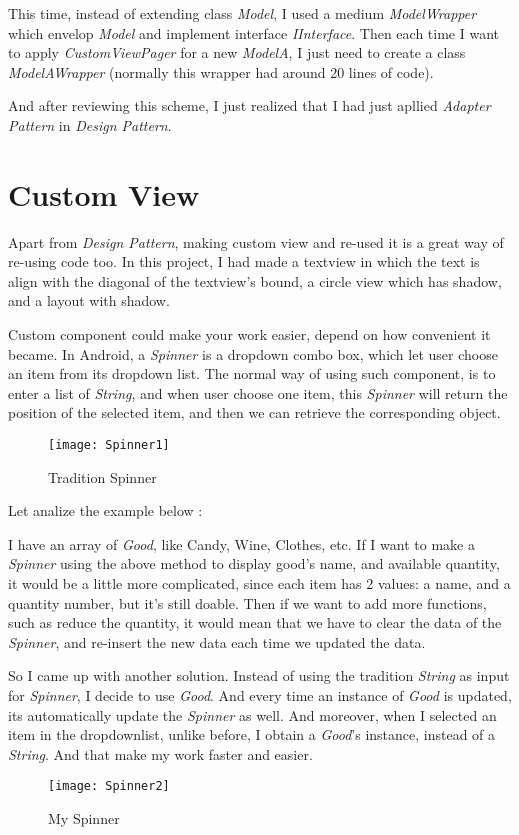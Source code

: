 This time, instead of extending class \textit{Model}, I used a medium \textit{ModelWrapper} which envelop \textit{Model} and implement interface \textit{IInterface}. Then each time I want to apply \textit{CustomViewPager} for a new \textit{ModelA}, I just need to create a class \textit{ModelAWrapper} (normally this wrapper had around 20 lines of code).

And after reviewing this scheme, I just realized that I had just apllied \textit{Adapter Pattern} in \textit{Design Pattern}.

\section{Custom View}

Apart from \textit{Design Pattern}, making custom view and re-used it is a great way of re-using code too. In this project, I had made a textview in which the text is align with the diagonal of the textview's bound, a circle view which has shadow, and a layout with shadow. 

Custom component could make your work easier, depend on how convenient it became. In Android, a \textit{Spinner} is a dropdown combo box, which let user choose an item from its dropdown list. The normal way of using such component, is to enter a list of \textit{String}, and when user choose one item, this \textit{Spinner} will return the position of the selected item, and then we can retrieve the corresponding object. 

\begin{figure}[H]
\centering
\texttt{[image: Spinner1]}
\caption{Tradition Spinner}
\end{figure}

Let analize the example below :

I have an array of \textit{Good}, like Candy, Wine, Clothes, etc. If I want to make a \textit{Spinner} using the above method to display good's name, and available quantity, it would be a little more complicated, since each item has 2 values: a name, and a quantity number, but it's still doable. Then if we want to add more functions, such as reduce the quantity, it would mean that we have to clear the data of the \textit{Spinner}, and re-insert the new data each time we updated the data. 

So I came up with another solution. Instead of using the tradition \textit{String} as input for \textit{Spinner}, I decide to use \textit{Good}. And every time an instance of \textit{Good} is updated, its automatically update the \textit{Spinner} as well. And moreover, when I selected an item in the dropdownlist, unlike before, I obtain a \textit{Good}'s instance, instead of a \textit{String}. And that make my work faster and easier. 

\begin{figure}[H]
\centering
\texttt{[image: Spinner2]}
\caption{My Spinner}
\end{figure}
